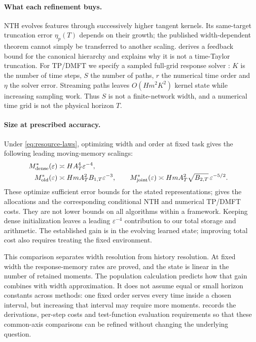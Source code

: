 \paragraph{What each refinement buys.}
NTH evolves features through successively higher tangent kernels.  Its
same-target truncation error $\eta_p(T)$ depends on their growth; the published
width-dependent theorem cannot simply be transferred to another scaling.
 derives a feedback bound for the canonical hierarchy
and explains why it is not a time-Taylor truncation.
For TP/DMFT we specify a sampled full-grid response solver
\citep{yang2021tensor,bordelon2022dmft}: $K$ is the number of time steps,
$S$ the number of paths, $r$ the numerical time order and $\eta$ the solver
error.  Streaming paths leaves $O(Hm^2K^2)$ kernel state while increasing
sampling work.  Thus $S$ is not a finite-network width, and a numerical
time grid is not the physical horizon $T$.

\paragraph{Size at prescribed accuracy.}
Under \eqref{eq:resource-laws}, optimizing width and order at fixed task gives
the following leading moving-memory scalings:
\begin{align}
 M_{\rm dense}^*(\varepsilon)&\asymp
 HA_T^4\varepsilon^{-4},\nonumber\\
 M_{\rm old}^*(\varepsilon)&\asymp
 HmA_T^2B_{1,T}\varepsilon^{-3},\qquad
 M_{\rm joint}^*(\varepsilon)\asymp
 HmA_T^2\sqrt{B_{2,T}}\,\varepsilon^{-5/2}.
 \label{eq:resource-optima}
\end{align}
These optimize sufficient error bounds for the stated representations;
 gives the allocations and the corresponding
conditional NTH and numerical TP/DMFT costs.  They are not lower bounds on
all algorithms within a framework.  Keeping dense initialization leaves a
leading $\varepsilon^{-4}$ contribution to our total storage and arithmetic.
The established gain is in the evolving learned state; improving total cost
also requires treating the fixed environment.

This comparison separates width resolution from history resolution.
At fixed width the response-memory rates are proved, and the state is linear
in the number of retained moments.  The population calculation predicts how
that gain combines with width approximation.  It does not assume equal or
small horizon constants across methods: one fixed order serves every time
inside a chosen interval, but increasing that interval may require more
moments.   records the derivations, per-step costs and
test-function evaluation requirements so that these common-axis comparisons
can be refined without changing the underlying question.
